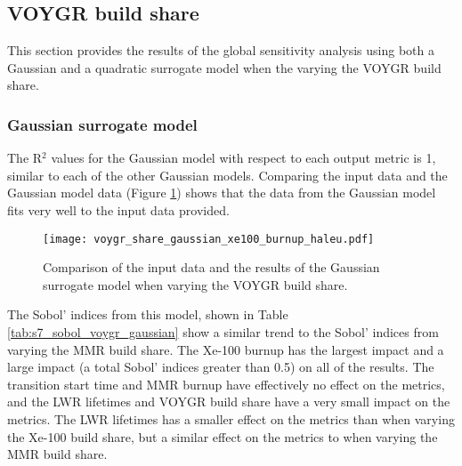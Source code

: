 \subsection{VOYGR build share}
This section provides the results of the global sensitivity analysis using 
both a Gaussian and a quadratic surrogate model when the varying the 
VOYGR build share. 

\subsubsection{Gaussian surrogate model}
The R$^2$ values for the Gaussian model with respect to 
each output metric is 1, similar to each of the other Gaussian 
models. Comparing the input data and the Gaussian model data 
(Figure \ref{fig:s7_voygr_gaussian}) shows that the data from the 
Gaussian model fits very well to the input data provided. 

\begin{figure}[h!]
    \centering 
    \texttt{[image: voygr\_share\_gaussian\_xe100\_burnup\_haleu.pdf]}
    \caption{Comparison of the input data and the results of the Gaussian 
    surrogate model when varying the VOYGR build share.}
    \label{fig:s7_voygr_gaussian}
\end{figure}

The Sobol' indices from this model, shown in Table \ref{tab:s7_sobol_voygr_gaussian}
show a similar trend to the Sobol' indices from varying the \gls{MMR}
build share. The Xe-100 burnup has the largest impact and a large impact 
(a total Sobol' indices greater than 0.5) on all of the 
results. The transition start time and \gls{MMR} burnup have effectively no 
effect on the metrics, and the \gls{LWR} lifetimes and VOYGR build share 
have a very small impact on the metrics. The \gls{LWR} lifetimes has a smaller 
effect on the metrics than when varying the Xe-100 build share, but a similar 
effect on the metrics to when varying the \gls{MMR} build share. 

